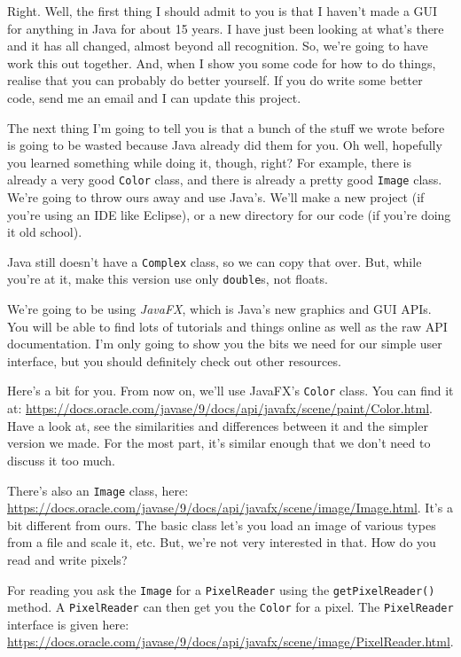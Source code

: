 \documentclass{article}
\begin{document}
        Right. Well, the first thing I should admit to you is that I haven't made a GUI for anything in Java for about 15 years. I have
        just been looking at what's there and it has all changed, almost beyond all recognition. So, we're going to have work this out
        together. And, when I show you some code for how to do things, realise that you can probably do better yourself. If you do write
        some better code, send me an email and I can update this project.
        
        The next thing I'm going to tell you is that a bunch of the stuff we wrote before is going to be wasted because Java already did
        them for you. Oh well, hopefully you learned something while doing it, though, right? For example, there is already a very good
        \texttt{Color} class, and there is already a pretty good \texttt{Image} class. We're going to throw ours away and use Java's. We'll
        make a new project (if you're using an IDE like Eclipse), or a new directory for our code (if you're doing it old school).
        
        Java still doesn't have a \texttt{Complex} class, so we can copy that over. But, while you're at it, make this version use only
        \texttt{double}s, not floats.
        
        We're going to be using \emph{JavaFX}, which is Java's new graphics and GUI APIs. You will be able to find lots of tutorials and
        things online as well as the raw API documentation. I'm only going to show you the bits we need for our simple user interface, but
        you should definitely check out other resources.
        
        Here's a bit for you. From now on, we'll use JavaFX's \texttt{Color} class. You can find it at:
        \url{https://docs.oracle.com/javase/9/docs/api/javafx/scene/paint/Color.html}. Have a look at, see the similarities and differences
        between it and the simpler version we made. For the most part, it's similar enough that we don't need to discuss it too much.
        
        There's also an \texttt{Image} class, here: \url{https://docs.oracle.com/javase/9/docs/api/javafx/scene/image/Image.html}. It's a
        bit different from ours. The basic class let's you load an image of various types from a file and scale it, etc. But, we're not
        very interested in that. How do you read and write pixels?
        
        For reading you ask the \texttt{Image} for a \texttt{PixelReader} using the \texttt{getPixelReader()} method. A
        \texttt{PixelReader} can then get you the \texttt{Color} for a pixel. The \texttt{PixelReader} interface is given here:
        \url{https://docs.oracle.com/javase/9/docs/api/javafx/scene/image/PixelReader.html}.
        
\end{document}
